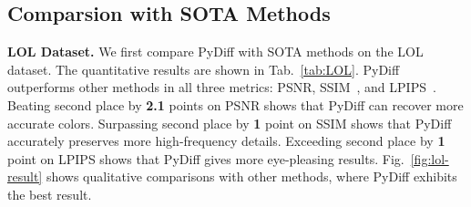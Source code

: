 \documentclass{article}
\begin{document}
\begin{table}[tb]  

\setlength{\tabcolsep}{3pt}
        \renewcommand{\arraystretch}{0.9} \centering
	\small
                    
	\caption{Quantitative results on the LOLV2 SYNC PART in terms of PSNR, SSIM, and LPIPS. All methods involved in the comparison were not retrained on the corresponding training set.  () denotes that larger (smaller) values lead to better quality.}
	\label{tab:LOLV2_sync}
\end{table}

\subsection{Comparsion with SOTA Methods}
\noindent \textbf{LOL Dataset.}
We first compare PyDiff with SOTA methods on the LOL dataset. The quantitative results are shown in Tab.~\ref{tab:LOL}. PyDiff outperforms other methods in all three metrics: PSNR, SSIM~\cite{wang2004image}, and LPIPS~\cite{zhang2018unreasonable}. Beating second place by \textbf{2.1} points on PSNR shows that PyDiff can recover more accurate colors. Surpassing second place by \textbf{1} point on SSIM shows that PyDiff accurately preserves more high-frequency details. Exceeding second place by \textbf{1} point on LPIPS shows that PyDiff gives more eye-pleasing results. Fig.~\ref{fig:lol-result} shows qualitative comparisons with other methods, where PyDiff exhibits the best result.
\end{document}
